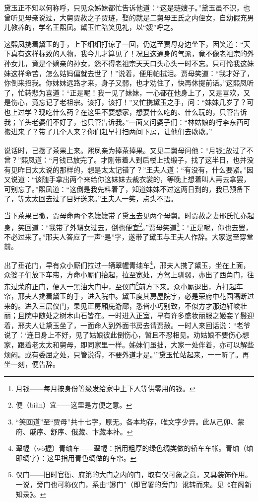 \par 黛玉正不知以何称呼，只见众姊妹都忙告诉他道：“这是琏嫂子。”黛玉虽不识，也曾听见母亲说过，大舅贾赦之子贾琏，娶的就是二舅母王氏之内侄女，自幼假充男儿教养的，学名王熙凤。黛玉忙陪笑见礼，以“嫂”呼之。
\par 这熙凤携着黛玉的手，上下细细打谅了一回，仍送至贾母身边坐下，因笑道：“天下真有这样标致的人物，我今儿才算见了！况且这通身的气派，竟不像老祖宗的外孙女儿，竟是个嫡亲的孙女，怨不得老祖宗天天口头心头一时不忘。只可怜我这妹妹这样命苦，怎么姑妈偏就去世了！”说着，便用帕拭泪。贾母笑道：“我才好了，你倒来招我。你妹妹远路才来，身子又弱，也才劝住了，快再休提前话。”这熙凤听了，忙转悲为喜道：“正是呢！我一见了妹妹，一心都在他身上了，又是喜欢，又是伤心，竟忘记了老祖宗。该打，该打！”又忙携黛玉之手，问：“妹妹几岁了？可也上过学？现吃什么药？在这里不要想家，想要什么吃的、什么玩的，只管告诉我；丫头老婆们不好了，也只管告诉我。”一面又问婆子们：“林姑娘的行李东西可搬进来了？带了几个人来？你们赶早打扫两间下房，让他们去歇歇。”
\par 说话时，已摆了茶果上来。熙凤亲为捧茶捧果。又见二舅母问他：“月钱\footnote{月钱——每月按身份等级发给家中上下人等供零用的钱。}放过了不曾？”熙凤道：“月钱已放完了。才刚带着人到后楼上找缎子，找了这半日，也并没有见昨日太太说的那样的，想是太太记错了？”王夫人道：“有没有，什么要紧。”因又说道：“该随手拿出两个来给你这妹妹去裁衣裳的，等晚上想着叫人再去拿罢，可别忘了。”熙凤道：“这倒是我先料着了，知道妹妹不过这两日到的，我已预备下了，等太太回去过了目好送来。”王夫人一笑，点头不语。
\par 当下茶果已撤，贾母命两个老嬷嬷带了黛玉去见两个母舅。时贾赦之妻邢氏忙亦起身，笑回道：“我带了外甥女过去，倒也便宜\footnote{便（biàn）宜——这里是方便之意。}。”贾母笑道\footnote{“笑回道”至“贾母”共十七字，原无。各本均存，唯文字少异。此从己卯、蒙府、戚序、舒序、俄藏、卞藏本补。}：“正是呢，你也去罢，不必过来了。”邢夫人答应了一声“是”字，遂带了黛玉与王夫人作辞。大家送至穿堂前。
\par 出了垂花门，早有众小厮们拉过一辆翠幄青䌷车\footnote{翠幄（wò握）青䌷车——翠幄：指用粗厚的绿色绸类做的轿车车帐。青䌷（䌷即绸字）：这里指用青色绸做的车帘。}，邢夫人携了黛玉，坐在上面，众婆子们放下车帘，方命小厮们抬起，拉至宽处，方驾上驯骡，亦出了西角门，往东过荣府正门，便入一黑油大门中，至仪门\footnote{仪门——旧时官衙、府第的大门之内的门，取有仪可象之意，又具装饰作用。一说，旁门也可称仪门，系由“謻门”（即官署的旁门）讹转而来。见《在阁新知录》。}前方下来。众小厮退出，方打起车帘，邢夫人搀着黛玉的手，进入院中。黛玉度其房屋院宇，必是荣府中花园隔断过来的。进入三层仪门，果见正房厢庑游廊，悉皆小巧别致，不似方才那边轩峻壮丽；且院中随处之树木山石皆在。一时进入正室，早有许多盛妆丽服之姬妾丫鬟迎着，邢夫人让黛玉坐了，一面命人到外面书房去请贾赦。一时人来回话说：“老爷说了：‘连日身上不好，见了姑娘彼此倒伤心，暂且不忍相见。劝姑娘不要伤心想家，跟着老太太和舅母，即同家里一样。姊妹们虽拙，大家一处伴着，亦可以解些烦闷。或有委屈之处，只管说得，不要外道才是。’”黛玉忙站起来，一一听了。再坐一刻，便告辞。
